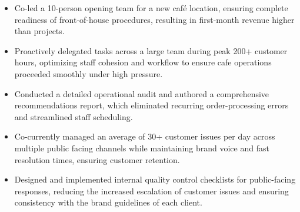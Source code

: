 \documentclass[10pt,a4paper,ragged2e,withhyper]{altacv}
\begin{document}
            \vspace{-0.5em}
            \begin{itemize}
            \item Co-led a 10-person opening team for a new café location, ensuring complete readiness of front-of-house procedures, resulting in first-month revenue higher than projects.
            \item Proactively delegated tasks across a large team during peak 200+ customer hours, optimizing staff cohesion and workflow to ensure cafe operations proceeded smoothly under high pressure.
            \item Conducted a detailed operational audit and authored a comprehensive recommendations report, which eliminated recurring order-processing errors and streamlined staff scheduling.
            \end{itemize}
            \vspace{-0.5em}
            \divider
            \vspace{0.5em}
            \vspace{-0.5em}
            \begin{itemize}
            \item Co-currently managed an average of 30+ customer issues per day across multiple public facing channels while maintaining brand voice and fast resolution times, ensuring customer retention.
            \item Designed and implemented internal quality control checklists for public-facing responses, reducing the increased escalation of customer issues and ensuring consistency with the brand guidelines of each client.
            \end{itemize}

        \vspace{-1em}
\end{document}
